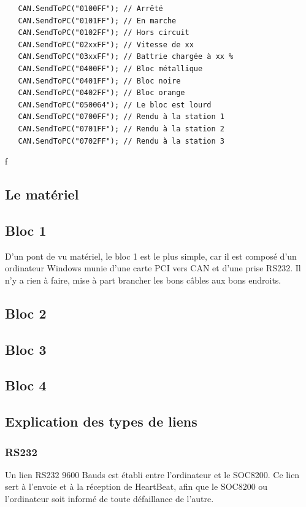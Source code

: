 \documentclass[10pt,a4paper,final]{article}
\begin{document}
\begin{lstlisting}
   CAN.SendToPC("0100FF"); // Arrêté
   CAN.SendToPC("0101FF"); // En marche
   CAN.SendToPC("0102FF"); // Hors circuit
   CAN.SendToPC("02xxFF"); // Vitesse de xx
   CAN.SendToPC("03xxFF"); // Battrie chargée à xx %
   CAN.SendToPC("0400FF"); // Bloc métallique
   CAN.SendToPC("0401FF"); // Bloc noire
   CAN.SendToPC("0402FF"); // Bloc orange
   CAN.SendToPC("050064"); // Le bloc est lourd
   CAN.SendToPC("0700FF"); // Rendu à la station 1
   CAN.SendToPC("0701FF"); // Rendu à la station 2
   CAN.SendToPC("0702FF"); // Rendu à la station 3
\end{lstlisting}
\begin{spacing}{1.5}
\pagebreak

\end{spacing}
f
\begin{spacing}{1.5}


\pagebreak

\section{Le matériel}
\subsection{Bloc 1}
D'un pont de vu matériel, le bloc 1 est le plus simple, car il est composé d'un ordinateur Windows munie d'une carte PCI vers CAN et d'une prise RS232. Il n'y a rien à faire, mise à part brancher les bons câbles aux bons endroits.

\subsection{Bloc 2}

\subsection{Bloc 3}

\subsection{Bloc 4}



\subsection{Explication des types de liens}
\subsubsection{RS232}
Un lien RS232 9600 Bauds est établi entre l'ordinateur et le SOC8200. Ce lien sert à l'envoie et à la réception de HeartBeat, afin que le SOC8200 ou l'ordinateur soit informé de toute défaillance de l'autre.


\end{spacing}
\end{document}
